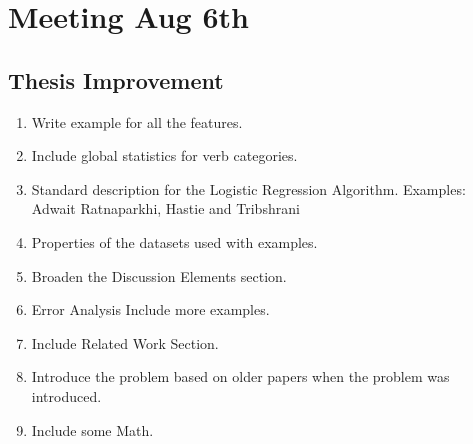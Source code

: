 \documentclass[11pt]{article}
\begin{document}
\section{Meeting Aug 6th}
\subsection{Thesis Improvement}
\begin{enumerate}
\item  Write example for all the features.
\item Include global statistics  for verb categories.
\item Standard description for the Logistic Regression Algorithm. Examples: Adwait Ratnaparkhi, Hastie and Tribshrani
\item Properties of the datasets used with examples.
\item Broaden the Discussion Elements section.
\item Error Analysis Include more examples.
\item Include Related Work Section.
\item Introduce the problem based on older papers when the problem was introduced.
\item Include some Math.
\end{enumerate}
\end{document}
